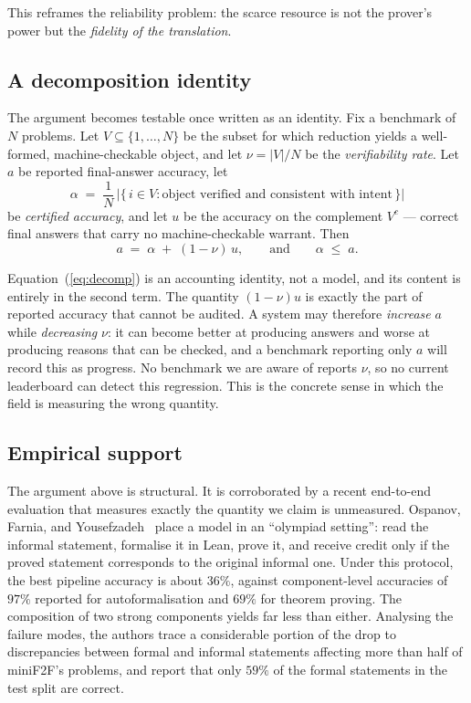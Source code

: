 \documentclass[11pt,a4paper]{article}
\begin{document}
This reframes the reliability problem: the scarce resource is not the prover's
power but the \emph{fidelity of the translation}.

\subsection{A decomposition identity}
\label{sec:identity}

The argument becomes testable once written as an identity.  Fix a benchmark of
$N$ problems.  Let $V \subseteq \{1,\dots,N\}$ be the subset for which
reduction yields a well-formed, machine-checkable object, and let
$\nu = |V|/N$ be the \emph{verifiability rate}.  Let $a$ be reported
final-answer accuracy, let
\begin{equation}
  \alpha \;=\; \frac{1}{N}\,
  \bigl|\{\,i \in V : \text{object verified and consistent with intent}\,\}\bigr|
  \label{eq:certified}
\end{equation}
be \emph{certified accuracy}, and let $u$ be the accuracy on the complement
$V^{c}$ --- correct final answers that carry no machine-checkable warrant.  Then
\begin{equation}
  a \;=\; \alpha \;+\; (1-\nu)\,u,
  \qquad\text{and}\qquad \alpha \;\le\; a .
  \label{eq:decomp}
\end{equation}

Equation~(\ref{eq:decomp}) is an accounting identity, not a model, and its
content is entirely in the second term.  The quantity $(1-\nu)u$ is exactly the
part of reported accuracy that cannot be audited.  A system may therefore
\emph{increase} $a$ while \emph{decreasing} $\nu$: it can become better at
producing answers and worse at producing reasons that can be checked, and a
benchmark reporting only $a$ will record this as progress.  No benchmark we are
aware of reports $\nu$, so no current leaderboard can detect this regression.
This is the concrete sense in which the field is measuring the wrong quantity.

\subsection{Empirical support}
\label{sec:evidence}

The argument above is structural.  It is corroborated by a recent end-to-end
evaluation that measures exactly the quantity we claim is unmeasured.  Ospanov,
Farnia, and Yousefzadeh~\cite{ospanov2025minif2f} place a model in an
``olympiad setting'': read the informal statement, formalise it in Lean, prove
it, and receive credit only if the proved statement corresponds to the original
informal one.  Under this protocol, the best pipeline accuracy is about
$36\%$, against component-level accuracies of $97\%$ reported for
autoformalisation and $69\%$ for theorem proving.  The composition of two
strong components yields far less than either.  Analysing the failure modes,
the authors trace a considerable portion of the drop to discrepancies between
formal and informal statements affecting more than half of miniF2F's problems,
and report that only $59\%$ of the formal statements in the test split are
correct.
\end{document}
